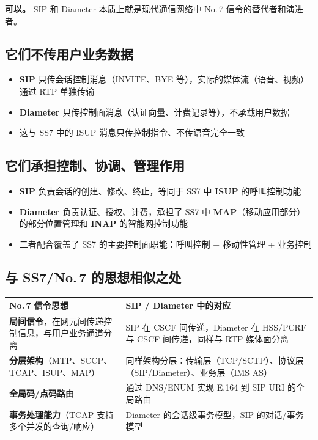 \documentclass[12pt,a4paper]{ctexart}
\begin{document}
\textbf{可以。} SIP 和 Diameter 本质上就是现代通信网络中 No.\,7 信令的替代者和演进者。

\subsection*{它们不传用户业务数据}
\begin{itemize}
  \item \textbf{SIP} 只传会话控制消息（INVITE、BYE 等），实际的媒体流（语音、视频）通过 RTP 单独传输
  \item \textbf{Diameter} 只传控制面消息（认证向量、计费记录等），不承载用户数据
  \item 这与 SS7 中的 ISUP 消息只传控制指令、不传语音完全一致
\end{itemize}

\subsection*{它们承担控制、协调、管理作用}
\begin{itemize}
  \item \textbf{SIP} 负责会话的创建、修改、终止，等同于 SS7 中 \textbf{ISUP} 的呼叫控制功能
  \item \textbf{Diameter} 负责认证、授权、计费，承担了 SS7 中 \textbf{MAP}（移动应用部分）的部分位置管理和 \textbf{INAP} 的智能网控制功能
  \item 二者配合覆盖了 SS7 的主要控制面职能：呼叫控制 + 移动性管理 + 业务控制
\end{itemize}

\subsection*{与 SS7/No.\,7 的思想相似之处}
\begin{table}[htbp]
\centering
\scriptsize
\begin{tabular}{p{5.5cm} p{8.5cm}}
\toprule
\textbf{No.\,7 信令思想} & \textbf{SIP / Diameter 中的对应} \\
\midrule
\textbf{局间信令}，在网元间传递控制信息，与用户业务通道分离 &
SIP 在 CSCF 间传递，Diameter 在 HSS/PCRF 与 CSCF 间传递，同样与 RTP 媒体面分离 \\
\addlinespace
\textbf{分层架构}（MTP、SCCP、TCAP、ISUP、MAP） &
同样架构分层：传输层（TCP/SCTP）、协议层（SIP/Diameter）、业务层（IMS AS） \\
\addlinespace
\textbf{全局码/点码路由} &
通过 DNS/ENUM 实现 E.164 到 SIP URI 的全局路由 \\
\addlinespace
\textbf{事务处理能力}（TCAP 支持多个并发的查询/响应） &
Diameter 的会话级事务模型，SIP 的对话/事务模型 \\
\bottomrule
\end{tabular}
\end{table}
\end{document}

